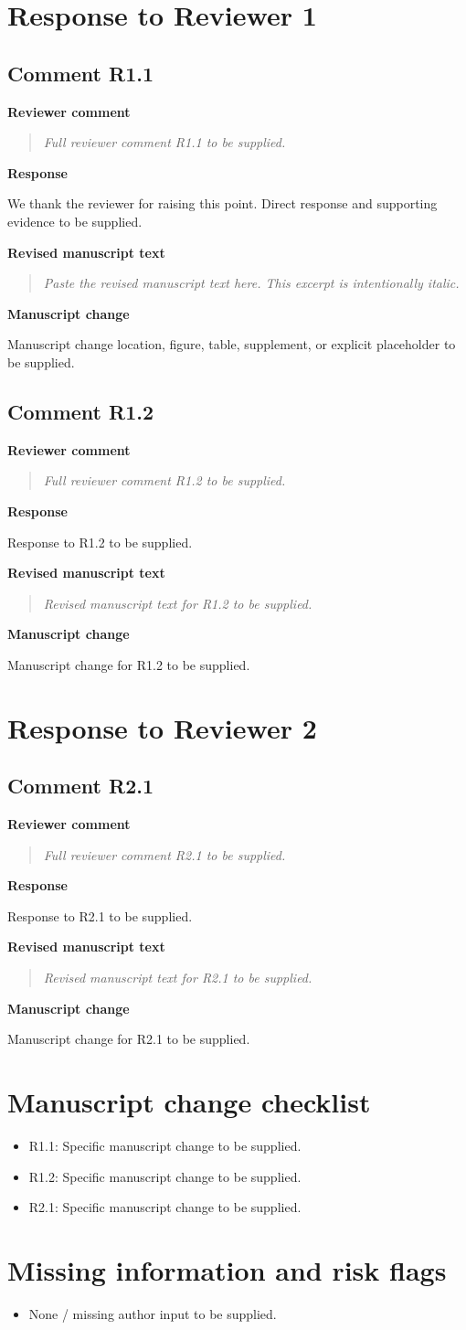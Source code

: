 \documentclass[11pt]{article}
\newcommand{\ReviewerComment}[1]{%
  \par\noindent\textbf{Reviewer comment}\par
  \begin{quote}\itshape #1\end{quote}
}
\newcommand{\AuthorResponse}[1]{%
  \par\noindent\textbf{Response}\par
  #1\par
}
\newcommand{\RevisedExcerpt}[1]{%
  \par\noindent\textbf{Revised manuscript text}\par
  \begin{quote}\itshape #1\end{quote}
}
\newcommand{\ManuscriptChange}[1]{%
  \par\noindent\textbf{Manuscript change}\par
  #1\par
}
\newcommand{\ReviewerSectionBreak}{\par\bigskip}
\newcommand{\ReviewerSection}[1]{%
  \ReviewerSectionBreak
  \section*{Response to Reviewer #1}
}
\begin{document}
\ReviewerSection{1}

\subsection*{Comment R1.1}
\ReviewerComment{Full reviewer comment R1.1 to be supplied.}
\AuthorResponse{We thank the reviewer for raising this point. Direct response and supporting evidence to be supplied.}
\RevisedExcerpt{Paste the revised manuscript text here. This excerpt is intentionally italic.}
\ManuscriptChange{Manuscript change location, figure, table, supplement, or explicit placeholder to be supplied.}

\subsection*{Comment R1.2}
\ReviewerComment{Full reviewer comment R1.2 to be supplied.}
\AuthorResponse{Response to R1.2 to be supplied.}
\RevisedExcerpt{Revised manuscript text for R1.2 to be supplied.}
\ManuscriptChange{Manuscript change for R1.2 to be supplied.}

\ReviewerSection{2}

\subsection*{Comment R2.1}
\ReviewerComment{Full reviewer comment R2.1 to be supplied.}
\AuthorResponse{Response to R2.1 to be supplied.}
\RevisedExcerpt{Revised manuscript text for R2.1 to be supplied.}
\ManuscriptChange{Manuscript change for R2.1 to be supplied.}

\section*{Manuscript change checklist}

\begin{itemize}[leftmargin=*]
  \item R1.1: Specific manuscript change to be supplied.
  \item R1.2: Specific manuscript change to be supplied.
  \item R2.1: Specific manuscript change to be supplied.
\end{itemize}

\section*{Missing information and risk flags}

\begin{itemize}[leftmargin=*]
  \item None / missing author input to be supplied.
\end{itemize}
\end{document}
